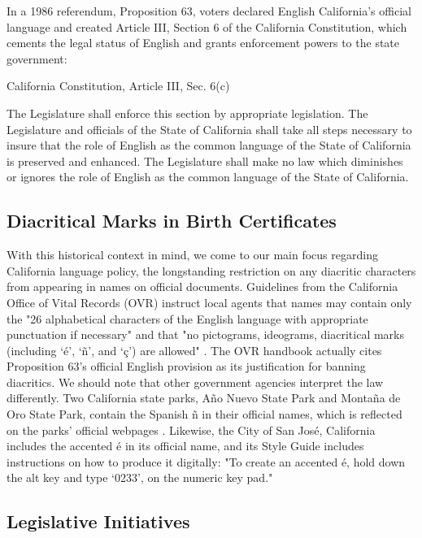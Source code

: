 In a 1986 referendum, Proposition 63, voters declared English California's
official language and created Article III, Section 6 of the California
Constitution, which cements the legal status of English and grants enforcement
powers to the state government: 

\begin{aquote}{California Constitution, Article III, Sec. 6(c)
	\parencite{ca-const}}

	The Legislature shall enforce this section by appropriate legislation. The
	Legislature and officials of the State of California shall take all steps
	necessary to insure that the role of English as the common language of the
	State of California is preserved and enhanced. The Legislature shall make no
	law which diminishes or ignores the role of English as the common language of
	the State of California.

\end{aquote}

\subsection{Diacritical Marks in Birth Certificates}

With this historical context in mind, we come to our main focus regarding
California language policy, the longstanding restriction on any diacritic
characters from appearing in names on official documents. Guidelines from the
California Office of Vital Records (OVR) instruct local agents that names may
contain only the "26 alphabetical characters of the English language with
appropriate punctuation if necessary" and that "no pictograms, ideograms,
diacritical marks (including `é', `ñ', and `ç') are allowed"
\parencite{larson11}. The OVR handbook actually cites Proposition 63's official
English provision as its justification for banning diacritics. We should note
that other government agencies interpret the law differently. Two California
state parks, Año Nuevo State Park and Montaña de Oro State Park, contain the
Spanish ñ in their official names, which is reflected on the parks' official
webpages \parencite{año-nuevo} \parencite{montaña-de-oro} \parencite{larson11}.
Likewise, the City of San José, California includes the accented é in its
official name, and its Style Guide includes instructions on how to produce it
digitally: "To create an accented é, hold down the alt key and type `0233'‚ on
the numeric key pad." \parencite{san-josé}

\subsection{Legislative Initiatives}

